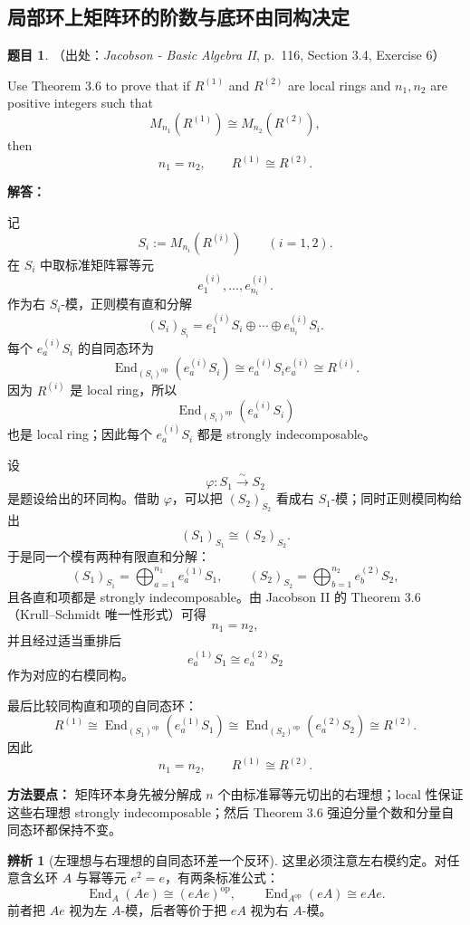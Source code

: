 \documentclass[a4paper]{ctexart}
\theoremstyle{definition}
\newtheorem{example}{题目}[section]
\theoremstyle{analysis}
\newtheorem{remark}{辨析}[section]
\theoremstyle{plain}
\begin{document}
\subsection{局部环上矩阵环的阶数与底环由同构决定}
\label{subsec:problem-matrix-ring-local-ks}

\begin{example}
（出处：\textit{Jacobson - Basic Algebra II}, p.~116, Section 3.4, Exercise 6）

Use Theorem 3.6 to prove that if \(R^{(1)}\) and \(R^{(2)}\) are local rings and
\(n_1,n_2\) are positive integers such that
\[
  M_{n_1}(R^{(1)})\cong M_{n_2}(R^{(2)}),
\]
then
\[
  n_1=n_2,
  \qquad
  R^{(1)}\cong R^{(2)}.
\]

\textbf{解答：}

记
\[
  S_i:=M_{n_i}(R^{(i)})\qquad (i=1,2).
\]
在 \(S_i\) 中取标准矩阵幂等元
\[
  e^{(i)}_1,\ldots,e^{(i)}_{n_i}.
\]
作为右 \(S_i\)-模，正则模有直和分解
\[
  (S_i)_{S_i}
  =
  e^{(i)}_1S_i\oplus\cdots\oplus e^{(i)}_{n_i}S_i.
\]
每个 \(e^{(i)}_aS_i\) 的自同态环为
\[
  \operatorname{End}_{(S_i)^{\operatorname{op}}}(e^{(i)}_aS_i)
  \cong
  e^{(i)}_aS_i e^{(i)}_a
  \cong
  R^{(i)}.
\]
因为 \(R^{(i)}\) 是 local ring，所以
\[
  \operatorname{End}_{(S_i)^{\operatorname{op}}}(e^{(i)}_aS_i)
\]
也是 local ring；因此每个 \(e^{(i)}_aS_i\) 都是 strongly indecomposable。

设
\[
  \varphi:S_1\xrightarrow{\sim}S_2
\]
是题设给出的环同构。借助 \(\varphi\)，可以把 \((S_2)_{S_2}\) 看成右 \(S_1\)-模；同时正则模同构给出
\[
  (S_1)_{S_1}\cong (S_2)_{S_2}.
\]
于是同一个模有两种有限直和分解：
\[
  (S_1)_{S_1}
  =
  \bigoplus_{a=1}^{n_1} e^{(1)}_aS_1,
  \qquad
  (S_2)_{S_2}
  =
  \bigoplus_{b=1}^{n_2} e^{(2)}_bS_2,
\]
且各直和项都是 strongly indecomposable。由 Jacobson II 的 Theorem 3.6
（Krull--Schmidt 唯一性形式）可得
\[
  n_1=n_2,
\]
并且经过适当重排后
\[
  e^{(1)}_aS_1\cong e^{(2)}_aS_2
\]
作为对应的右模同构。

最后比较同构直和项的自同态环：
\[
  R^{(1)}
  \cong
  \operatorname{End}_{(S_1)^{\operatorname{op}}}(e^{(1)}_aS_1)
  \cong
  \operatorname{End}_{(S_2)^{\operatorname{op}}}(e^{(2)}_aS_2)
  \cong
  R^{(2)}.
\]
因此
\[
  n_1=n_2,\qquad R^{(1)}\cong R^{(2)}.
\]

\textbf{方法要点：}
矩阵环本身先被分解成 \(n\) 个由标准幂等元切出的右理想；local 性保证这些右理想 strongly indecomposable；然后 Theorem 3.6 强迫分量个数和分量自同态环都保持不变。

\begin{remark}[左理想与右理想的自同态环差一个反环]
这里必须注意左右模约定。对任意含幺环 \(A\) 与幂等元 \(e^2=e\)，有两条标准公式：
\[
  \operatorname{End}_A(Ae)\cong (eAe)^{\operatorname{op}},
  \qquad
  \operatorname{End}_{A^{\operatorname{op}}}(eA)\cong eAe.
\]
前者把 \(Ae\) 视为左 \(A\)-模，后者等价于把 \(eA\) 视为右 \(A\)-模。


\end{remark}
\end{example}
\end{document}
